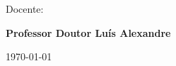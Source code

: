 \vspace{0,5cm}
\begin{center}
\begin{normalsize}
\begin{large}
Docente:
\end{large}
\end{normalsize}
\end{center}

\vspace{0.2cm}
\begin{center}
\begin{large}
\textbf{Professor Doutor Luís Alexandre}
\end{large}
\end{center}



\vspace{0.5cm}
\begin{center}
\begin{normalsize}
\today
\end{normalsize}
\end{center}
